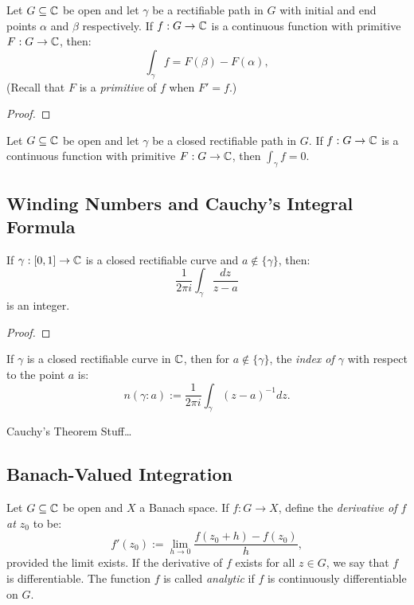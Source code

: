 \begin{theorem}
	Let $G \subseteq \mathbb{C}$ be open and let $\gamma$ be a rectifiable path in $G$ with initial and end points $\alpha$ and $\beta$ respectively. If $f:G \rightarrow \mathbb{C}$ is a continuous function with primitive $F:G \rightarrow \mathbb{C}$, then:
	\[
		\int_{\gamma}^{}f  = F(\beta)-F(\alpha),
	\] 
	(Recall that $F$ is a \emph{primitive} of $f$ when $F' = f$.)
\end{theorem}
{\color{red}
\begin{proof}
		
\end{proof}}

\begin{corollary}
	Let $G \subseteq \mathbb{C}$ be open and let $\gamma$ be a closed rectifiable path in $G$. If $f:G \rightarrow \mathbb{C}$ is a continuous function with primitive $F:G \rightarrow \mathbb{C}$, then $\int_{\gamma}^{} f = 0$.
\end{corollary}

\subsection{Winding Numbers and Cauchy's Integral Formula}

\begin{proposition}
	If $\gamma:[0,1] \rightarrow \mathbb{C}$ is a closed rectifiable curve and $a \not\in \{\gamma\}$, then:
	\[
		\frac{1}{2\pi i}\int_{\gamma}^{} \frac{dz}{z-a}
	\] 
	is an integer.
\end{proposition}
{\color{red}
\begin{proof}
		
\end{proof}}

\begin{definition}
	If $\gamma$ is a closed rectifiable curve in $\mathbb{C}$, then for $a \not\in \{\gamma\}$, the \emph{index of $\gamma$} with respect to the point $a$ is:
	\[
		n(\gamma : a) := \frac{1}{2\pi i} \int_{\gamma}^{} (z-a)^{-1}dz. 
	\] 
\end{definition}

{\color{red} Cauchy's Theorem Stuff\ldots}

\subsection{Banach-Valued Integration}

\begin{definition}
	Let $G \subseteq \mathbb{C}$ be open and $X$ a Banach space. If $f:G \rightarrow X$, define the \emph{derivative of $f$ at $z_0$} to be:
	\[
		f'(z_0) := \lim_{h \rightarrow 0}\frac{f(z_0 + h) - f(z_0)}{h},
	\] 
	provided the limit exists. If the derivative of $f$ exists for all $z \in G$, we say that $f$ is differentiable. The function $f$ is called \emph{analytic} if $f$ is continuously differentiable on $G$.
\end{definition}

